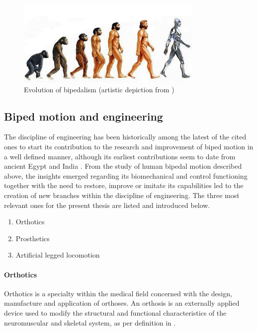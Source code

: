 \begin{figure}[h]
	\centering
	\includegraphics[width=0.8\textwidth]{figures/artificialhumans.jpg}
	\caption{Evolution of bipedalism (artistic depiction from \cite{human_evol_fig})}
	\label{fig:biped_evolution}
\end{figure}

\subsection{Biped motion and engineering} %
\label{sub:bipedalism_and_engineering}
The discipline of engineering has been historically among the latest of the cited ones to start its contribution to the research and improvement of biped motion in a well defined manner, although its earliest contributions seem to date from ancient Egypt and India \cite{prosthetics_history}.
From the study of human bipedal motion described above, the insights emerged regarding its biomechanical and control functioning together with the need to restore, improve or imitate its capabilities led to the creation of new branches within the discipline of engineering.
The three most relevant ones for the present thesis are listed and introduced below.

\begin{enumerate}
	\item Orthotics
	\item Prosthetics
	\item Artificial legged locomotion 
\end{enumerate}

\paragraph{Orthotics} %
\label{par:orthotics}
Orthotics is a specialty within the medical field concerned with the design, manufacture and application of orthoses. An orthosis is an externally applied device used to modify the structural and functional characteristics of the neuromuscular and skeletal system, as per definition in \cite{ISO_orthosis}.

